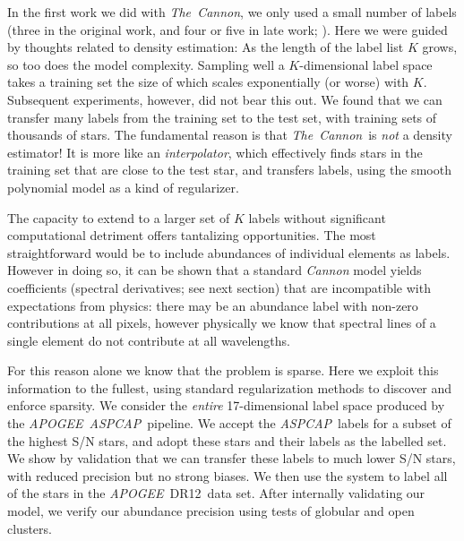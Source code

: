 \documentclass[12pt,preprint]{aastex}
\newcommand{\project}[1]{\textsl{#1}}
\newcommand{\TheCannon}{\project{The~Cannon}}
\newcommand{\acronym}[1]{{\small{#1}}}
\newcommand{\apogee}{\project{\acronym{APOGEE}}}
\newcommand{\aspcap}{\project{\acronym{ASPCAP}}}
\newcommand{\dr}{\acronym{DR12}}
\begin{document}





In the first work we did with \TheCannon, we only used a small number of labels
(three in the original work, and four or five in late work; \citealt{tc, age}). 
Here we were guided by thoughts related to density estimation: As the length of 
the label list $K$ grows, so too does the model complexity.  Sampling well a 
$K$-dimensional label space takes a training set the size of which scales 
exponentially (or worse) with $K$.  Subsequent experiments, however, did not 
bear this out. We found that we can transfer many labels from the training set 
to the test set, with training sets of thousands of stars.  The fundamental 
reason is that \TheCannon\ is \emph{not} a density estimator!  It is more like 
an \emph{interpolator}, which effectively finds stars in the training set that 
are close to the test star, and transfers labels, using the smooth polynomial 
model as a kind of regularizer.


The capacity to extend to a larger set of $K$ labels without significant
computational detriment offers tantalizing opportunities.  The most 
straightforward would be to include abundances of individual elements as labels.
However in doing so, it can be shown that a standard \emph{Cannon} model yields
coefficients (spectral derivatives; see next section) that are incompatible with 
expectations from physics: there may be an abundance label with non-zero 
contributions at all pixels, however physically we know that spectral lines of a
single element do not contribute at all wavelengths. 


For this reason alone we know that the problem is sparse.  Here we exploit this 
information to the fullest, using standard regularization methods to discover
and enforce sparsity. We consider the \emph{entire} 17-dimensional label space 
produced by the \apogee\ \aspcap\ pipeline.  We accept the \aspcap\ labels for 
a subset of the highest S/N stars, and adopt these stars and their labels as the
labelled set.  We show by validation that we can transfer these labels to much 
lower S/N stars, with reduced precision but no strong biases.  We then use the
system to label all of the stars in the \apogee\ \dr\ data set.  After
internally validating our model, we verify our abundance precision using tests
of globular and open clusters.
\end{document}
